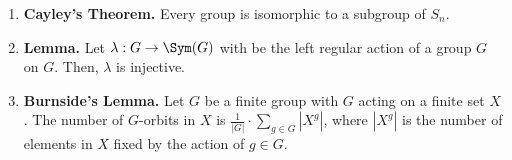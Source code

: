 \begin{enumerate}
	\item \textbf{Cayley's Theorem. } Every group is isomorphic to a subgroup of $S_n$. 
	\item \textbf{Lemma. } Let $\lambda: G \to \Sym(G)$ with be the left regular action of a group $G$ on $G$. Then, $\lambda$ is injective. 
	\item \textbf{Burnside's Lemma. } Let $G$ be a finite group with $G$ acting on a finite set $X$. The number of $G$-orbits in $X$ is $\frac{1}{|G|} \cdot \sum_{g \in G} |X^g|$, where $|X^g|$ is the number of elements in $X$ fixed by the action of $g \in G$. 
\end{enumerate}


